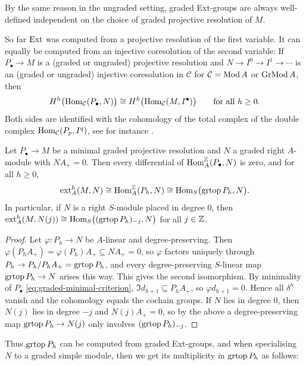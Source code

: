 By the same reason in the ungraded setting, graded Ext-groups are always well-defined independent on the choice of graded projective resolution of $M$.

\begin{advanced}
\begin{remark}\label{rem:ext-balancing}
So far $\operatorname{Ext}\nolimits$ was computed from a projective resolution of the first variable.
It can equally be computed from an injective coresolution of the second variable: If $P_\bullet\to M$ is a (graded or ungraded) projective resolution and $N\to I^0\to I^1\to\cdots$ is an (graded or ungraded) injective coresolution in $\mathcal C$ for $\mathcal{C}=\operatorname{\mathrm{Mod}} A$ or $\operatorname{\mathrm{GrMod}} A$, then
\[
H^h\bigl(\operatorname{Hom}\nolimits_{\mathcal C}(P_\bullet,N)\bigr)\cong H^h\bigl(\operatorname{Hom}\nolimits_{\mathcal C}(M,I^\bullet)\bigr)\qquad\text{for all }h\geq0.
\]
Both sides are identified with the cohomology of the total complex of the double complex $\operatorname{Hom}\nolimits_{\mathcal C}(P_p,I^q)$, see for instance \cite[Theorem~2.7.6]{Wei94}.
\end{remark}
\end{advanced}

\begin{proposition}\label{prop:ext-minimal}
Let $P_\bullet\to M$ be a minimal graded projective resolution and $N$ a graded right $A$-module with $NA_+=0$.
Then every differential of $\operatorname{Hom}\nolimits_A^{\mathbb{Z}}(P_\bullet,N)$ is zero, and for all $h\geq0$,
\[
\operatorname{ext}\nolimits_A^h(M,N)\cong\operatorname{Hom}\nolimits_A^{\mathbb{Z}}(P_h,N)\cong\operatorname{Hom}\nolimits_S\bigl(\operatorname{grtop}\nolimits P_h,N\bigr).
\]
In particular, if $N$ is a right $S$-module placed in degree $0$, then $\operatorname{ext}\nolimits_A^h(M,N(j))\cong\operatorname{Hom}\nolimits_S\bigl((\operatorname{grtop}\nolimits P_h)_{-j},N\bigr)$ for all $j\in\mathbb{Z}$.
\end{proposition}

\begin{proof}
Let $\varphi:P_h\to N$ be $A$-linear and degree-preserving.
Then $\varphi(P_hA_+)=\varphi(P_h)A_+\subseteq NA_+=0$, so $\varphi$ factors uniquely through $P_h\to P_h/P_hA_+=\operatorname{grtop}\nolimits P_h$, and every degree-preserving $S$-linear map $\operatorname{grtop}\nolimits P_h\to N$ arises this way.
This gives the second isomorphism.
By minimality of $P_\bullet$ \eqref{eq:graded-minimal-criterion}, $\Im d_{h+1}\subseteq P_hA_+$, so $\varphi d_{h+1}=0$.
Hence all $\delta^h$ vanish and the cohomology equals the cochain groups.
If $N$ lies in degree $0$, then $N(j)$ lies in degree $-j$ and $N(j)A_+=0$, so by the above a degree-preserving map $\operatorname{grtop}\nolimits P_h\to N(j)$ only involves $(\operatorname{grtop}\nolimits P_h)_{-j}$.
\end{proof}

Thus $\operatorname{grtop}\nolimits P_h$ can be computed from graded Ext-groups, and when specialising $N$ to a graded simple module, then we get its multiplicity in $\operatorname{grtop}\nolimits P_h$ as follows:

